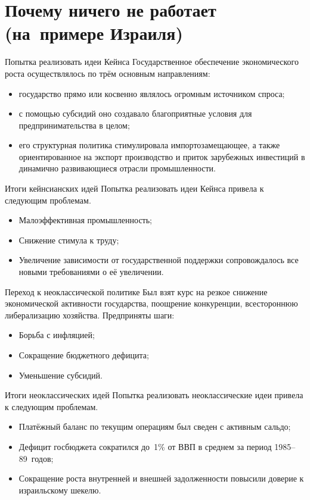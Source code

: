 \documentclass{beamer}
\begin{document}
	\section{Почему ничего не работает (на~примере Израиля)}
	
	\begin{frame}{Попытка реализовать идеи Кейнса}
		Государственное обеспечение экономического роста осуществлялось по трём основным направлениям:
		\begin{itemize}
		\item государство прямо или косвенно являлось огромным источником спроса;
		\item с помощью субсидий оно создавало благоприятные условия для предпринимательства в целом;
		\item его структурная политика стимулировала импортозамещающее, а также ориентированное на экспорт производство и приток зарубежных инвестиций в динамично развивающиеся отрасли промышленности.
		\end{itemize}
	\end{frame}

	\begin{frame}{Итоги кейнсианских идей}
		Попытка реализовать идеи Кейнса привела к следующим проблемам.
		\begin{itemize}
			\item Малоэффективная промышленность;
			\item Снижение стимула к труду;
			\item Увеличение зависимости от государственной поддержки сопровождалось все новыми требованиями о её увеличении.
		\end{itemize}
	\end{frame}

	\begin{frame}{Переход к неоклассической политике}
		Был взят курс на резкое снижение экономической активности государства, поощрение конкуренции, всестороннюю либерализацию хозяйства.
		Предприняты шаги:
		\begin{itemize}
		\item Борьба с инфляцией;
		\item Сокращение бюджетного дефицита;
		\item Уменьшение субсидий.
		\end{itemize}
	\end{frame}
	
	\begin{frame}{Итоги неоклассических идей}
		Попытка реализовать неоклассические идеи привела к следующим проблемам.
		\begin{itemize}
			\item Платёжный баланс по текущим операциям был сведен с активным сальдо;
			\item Дефицит госбюджета сократился до~1\% от ВВП в среднем за период 1985--89~годов;
			\item Сокращение роста внутренней и внешней задолженности повысили доверие к израильскому шекелю.
		\end{itemize}
	\end{frame}
\end{document}
